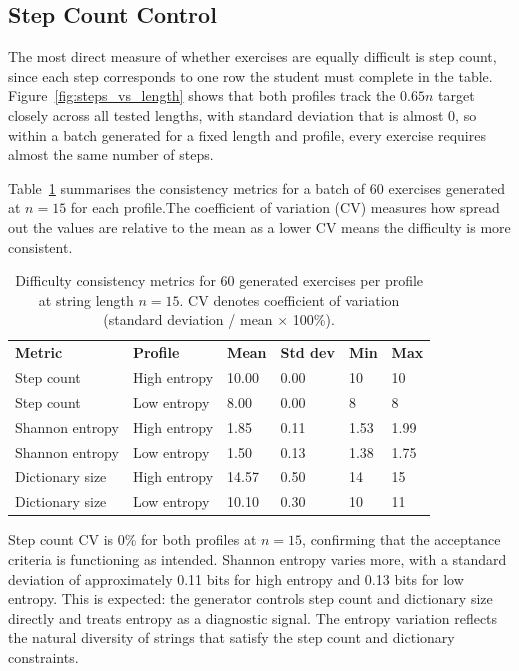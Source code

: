 \documentclass{l4proj}
\begin{document}
\subsection{Step Count Control}

The most direct measure of whether exercises are equally difficult is step count, since each step corresponds to one row the student must complete in the table. Figure~\ref{fig:steps_vs_length} shows that both profiles track the $0.65n$ target closely across all tested lengths, with standard deviation that is almost 0, so within a batch generated for a fixed length and profile, every exercise requires almost the same number of steps.

Table~\ref{tab:consistency} summarises the consistency metrics for a batch of 60 exercises generated at $n = 15$ for each profile.The coefficient of variation (CV) measures how spread out the values are relative to the mean as a lower CV means the difficulty is more consistent.

\begin{table}[htb]
\caption{Difficulty consistency metrics for 60 generated exercises per profile at string length $n = 15$. CV denotes coefficient of variation (standard deviation / mean $\times$ 100\%).}
\label{tab:consistency}
\begin{tabular}{@{}llllll@{}}
\textbf{Metric} & \textbf{Profile} & \textbf{Mean} & \textbf{Std dev}
    & \textbf{Min} & \textbf{Max} \\
Step count      & High entropy & \num{10.00} & \num{0.00} & 10 & 10 \\
Step count      & Low entropy  & \num{8.00}  & \num{0.00} & 8  & 8  \\
Shannon entropy & High entropy & \num{1.85}  & \num{0.11} & \num{1.53} & \num{1.99} \\
Shannon entropy & Low entropy  & \num{1.50}  & \num{0.13} & \num{1.38} & \num{1.75} \\
Dictionary size & High entropy & \num{14.57} & \num{0.50} & 14 & 15 \\
Dictionary size & Low entropy  & \num{10.10} & \num{0.30} & 10 & 11 \\
\end{tabular}
\end{table}

Step count CV is 0\% for both profiles at $n = 15$, confirming that the acceptance criteria is functioning as intended. Shannon entropy varies more, with a standard deviation of approximately 0.11 bits for high entropy and 0.13 bits for low entropy. This is expected: the generator controls step count and dictionary size directly and treats entropy as a diagnostic signal. The entropy variation reflects the natural diversity of strings that satisfy the step count and dictionary constraints.
\end{document}
